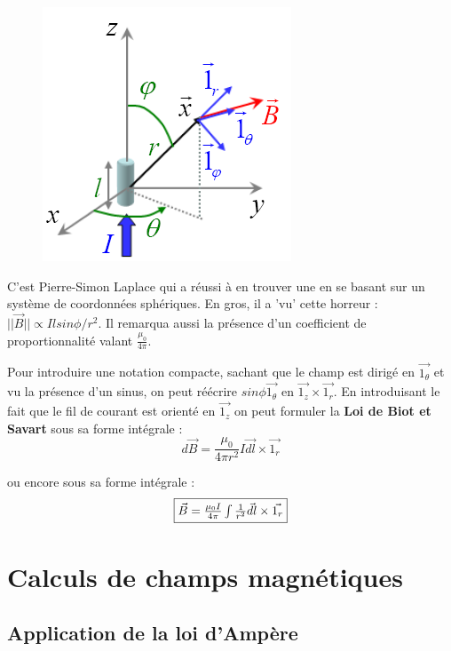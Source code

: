 \documentclass	[11pt, a4paper, openany]{book}
\begin{document}
\begin{figure}
	\includegraphics[scale=0.55]{magneto/image6.png}
\end{figure}

C'est Pierre-Simon Laplace qui a réussi à en trouver une en se basant sur un système de coordonnées sphériques. En gros, il a 'vu' cette  horreur : $ ||\vec{B}|| \propto Il sin\phi / r^2$. Il remarqua aussi la présence d'un coefficient de proportionnalité valant $\frac{\mu_0}{4\pi}$.



Pour introduire une notation compacte, sachant que le champ est dirigé en $\vec{1_\theta}$ et vu la présence d'un sinus, on peut réécrire $sin\phi \vec{1_\theta}$ en $\vec{1_z} \times \vec{1_r}$. En introduisant le fait que le fil de courant est orienté en $\vec{1_z}$ on peut formuler la \textbf{Loi de Biot et Savart} sous sa forme intégrale :
\begin{equation}
	d\vec{B} = \frac{\mu_0}{4\pi r^2}I\vec{dl} \times \vec{1_r}
\end{equation}

ou encore sous sa forme intégrale :
\begin{equation}
	\fbox{$\vec{B} = \frac{\mu_0 I}{4\pi} \int \frac{1}{r^2}\vec{dl} \times \vec{1_r}$}
\end{equation}


\section{Calculs de champs magnétiques}
\subsection{Application de la loi d'Ampère}
\end{document}
